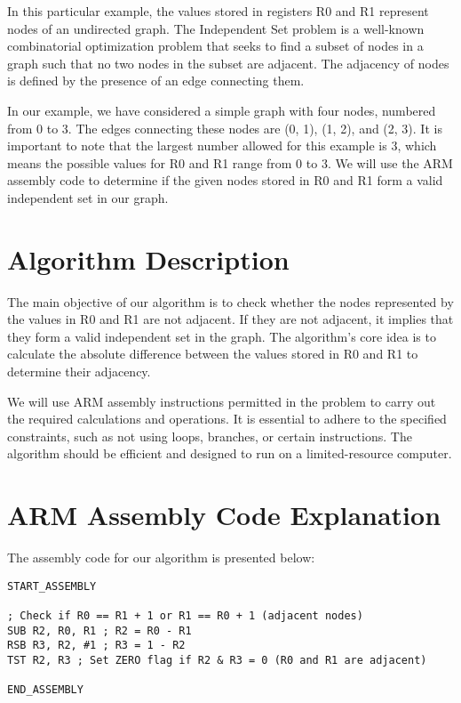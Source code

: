 In this particular example, the values stored in registers R0 and R1 represent nodes of an undirected graph. The Independent Set problem is a well-known combinatorial optimization problem that seeks to find a subset of nodes in a graph such that no two nodes in the subset are adjacent. The adjacency of nodes is defined by the presence of an edge connecting them.

In our example, we have considered a simple graph with four nodes, numbered from 0 to 3. The edges connecting these nodes are (0, 1), (1, 2), and (2, 3). It is important to note that the largest number allowed for this example is 3, which means the possible values for R0 and R1 range from 0 to 3. We will use the ARM assembly code to determine if the given nodes stored in R0 and R1 form a valid independent set in our graph.

\section{Algorithm Description}

The main objective of our algorithm is to check whether the nodes represented by the values in R0 and R1 are not adjacent. If they are not adjacent, it implies that they form a valid independent set in the graph. The algorithm's core idea is to calculate the absolute difference between the values stored in R0 and R1 to determine their adjacency.

We will use ARM assembly instructions permitted in the problem to carry out the required calculations and operations. It is essential to adhere to the specified constraints, such as not using loops, branches, or certain instructions. The algorithm should be efficient and designed to run on a limited-resource computer.

\section{ARM Assembly Code Explanation}

The assembly code for our algorithm is presented below:

\begin{verbatim}
START_ASSEMBLY

; Check if R0 == R1 + 1 or R1 == R0 + 1 (adjacent nodes)
SUB R2, R0, R1 ; R2 = R0 - R1
RSB R3, R2, #1 ; R3 = 1 - R2
TST R2, R3 ; Set ZERO flag if R2 & R3 = 0 (R0 and R1 are adjacent)

END_ASSEMBLY
\end{verbatim}

